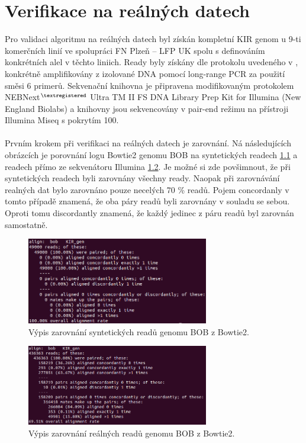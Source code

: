 \documentclass[czech,DP]{thesiskiv}
\numberwithin{equation}{section}
\begin{document}
\chapter{Verifikace na reálných datech}
Pro validaci algoritmu na reálných datech byl získán kompletní KIR genom u 9-ti komerčních linií ve spolupráci FN Plzeň – LFP UK spolu s definováním konkrétních alel v těchto liniich. Ready byly získány dle protokolu uvedeného v \cite{real_data}, konkrétně  amplifikovány z izolované DNA pomocí long-range PCR za použití směsi 6 primerů. Sekvenační knihovna je připravena modifikovaným protokolem NEBNext$^{\textregistered}$ Ultra TM II FS DNA Library Prep Kit for Illumina (New England Biolabs) a knihovny jsou sekvencovány v pair-end režimu na přístroji Illumina Miseq s pokrytím 100.  
\\
\\
Prvním krokem při verifikaci na reálných datech je zarovnání. Ná následujících obrázcích je porovnání logu Bowtie2 genomu BOB na syntetických readech \ref{fig:bob_syntetic_bowtie_align} a readech přímo ze sekvenátoru Illumina \ref{fig:bob_real_bowtie_align}. Je možné si zde povšimnout, že při syntetických readech byli zarovnány všechny ready. Naopak při zarovnávání realných dat bylo zarovnáno pouze necelých 70 \% readů. Pojem concordanly v tomto případě znamená, že oba páry readů byli zarovnány v souladu se sebou. Oproti tomu discordantly znamená, že každý jedinec z páru readů byl zarovnán samostatně.

\begin{figure}[H]		
		\centering
		\includegraphics[width=300px]{./img/bob_syntetic_bowtie_align.png}
		\caption{Výpis zarovnání syntetických readů genomu BOB z Bowtie2.}
		\label{fig:bob_syntetic_bowtie_align}
\end{figure}

\begin{figure}[H]		
		\centering
		\includegraphics[width=300px]{./img/bob_real_bowtie_align.png}
		\caption{Výpis zarovnání reálných readů genomu BOB z Bowtie2.}
		\label{fig:bob_real_bowtie_align}
\end{figure}
\end{document}
